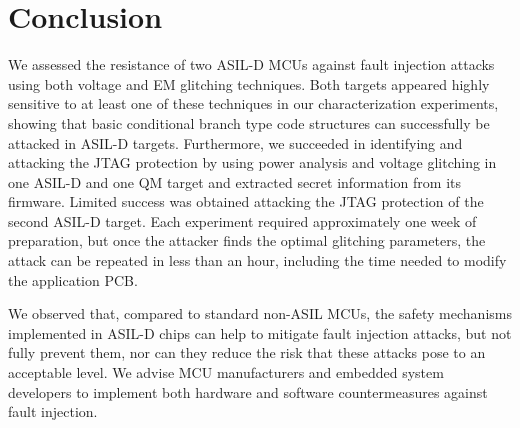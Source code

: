 \documentclass[10pt, conference, compsocconf]{IEEEtran}
\begin{document}
\section{Conclusion}
We assessed the resistance of two ASIL-D MCUs against fault injection attacks using both voltage and EM glitching techniques. Both targets appeared highly sensitive to at least one of these techniques in our characterization experiments, showing that basic conditional branch type code structures can successfully be attacked in ASIL-D targets. Furthermore, we succeeded in identifying and attacking the JTAG protection by using power analysis and voltage glitching in one ASIL-D and one QM target and extracted secret information from its firmware. Limited success was obtained attacking the JTAG protection of the second ASIL-D target. Each experiment required approximately one week of preparation, but once the attacker finds the optimal glitching parameters, the attack can be repeated in less than an hour, including the time needed to modify the application PCB.

We observed that, compared to standard non-ASIL MCUs, the safety mechanisms implemented in ASIL-D chips can help to mitigate fault injection attacks, but not fully prevent them, nor can they reduce the risk that these attacks pose to an acceptable level. We advise MCU manufacturers and embedded system developers to implement both hardware and software countermeasures against fault injection.

\newpage





\end{document}
